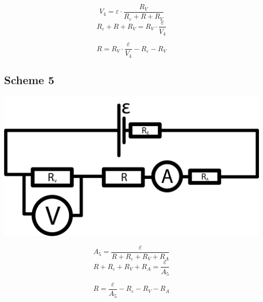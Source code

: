 \documentclass[11pt]{memoir}
\begin{document}
    \begin{equation*}
        V_4 = \varepsilon \cdot \frac{R_V}{R_\varepsilon + R + R_V}
    \end{equation*}
    \begin{equation*}
        R_\varepsilon + R + R_V = R_V \cdot \frac{\varepsilon}{V_4}
    \end{equation*}

    \begin{equation}\label{eq:equation4}
        R = R_V \cdot \frac{\varepsilon}{V_4} - R_\varepsilon - R_V
    \end{equation}


    \newpage

    \subsection{Scheme 5}\label{subsec:scheme-5}

    \includegraphics[width=\linewidth]{../schemes/Scheme5.png}

    \begin{equation*}
        A_5 = \frac{\varepsilon}{R + R_\varepsilon + R_V + R_A}
    \end{equation*}
    \begin{equation*}
        R + R_\varepsilon + R_V + R_A = \frac{\varepsilon}{A_5}
    \end{equation*}

    \begin{equation}\label{eq:equation5}
        R = \frac{\varepsilon}{A_5} - R_\varepsilon - R_V - R_A
    \end{equation}


%
%
\end{document}
